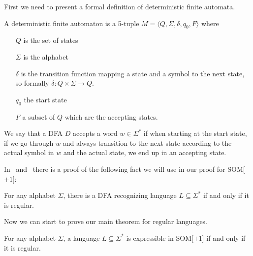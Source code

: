 First we need to present a formal definition of deterministic finite automata.
\begin{define}[DFA]
    A deterministic finite automaton is a 5-tuple $M = \langle Q, \Sigma, \delta, q_0,  F \rangle$ where
    \begin{itemize}
        \setlength\itemsep{0.2em}
        \item[$Q$] is the set of states
        \item[$\Sigma$] is the alphabet
        \item[$\delta$] is the transition function mapping a state and a symbol to the next state, so formally $\delta : Q\times \Sigma \to Q$.
        \item[$q_0$] the start state
        \item[$F$] a subset of $Q$ which are the accepting states.
    \end{itemize}
\end{define}
We say that a DFA $D$ accepts a word $w \in \Sigma^{*}$ if when starting at the start state, if we go through $w$ and always transition to the next state according to the actual symbol in $w$ and the actual state, we end up in an accepting state.

In~\cite{theory-cs} and~\cite{Straubing1994} there is a proof of the following fact we will use in our proof for SOM[$+1$]:
\begin{theorem}
    For any alphabet $\Sigma$, there is a DFA recognizing language $L \subseteq \Sigma^{*}$ if and only if it is regular.
\end{theorem}

Now we can start to prove our main theorem for regular languages.
\begin{theorem}
    For any alphabet $\Sigma$, a language $L \subseteq \Sigma^{*}$ is expressible in SOM[$+1$] if and only if it is regular.
\end{theorem}

